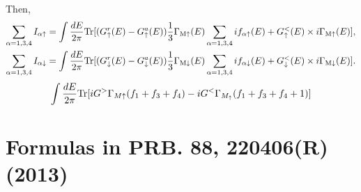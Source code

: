 \documentclass[aps,prb,superscriptaddress]{revtex4-2}
\begin{document}
Then, 
\begin{gather}
\begin{split}
\sum_{\alpha=1,3,4}I_{\alpha\uparrow} & = \int \frac{dE}{2\pi} {\rm Tr} [(G_{\uparrow}^r(E)-G_{\uparrow}^a(E))\frac{1}{3}\Gamma_{{\rm M}\uparrow}(E) \sum_{\alpha=1,3,4} if_{\alpha\uparrow}(E) + G_{\uparrow}^<(E) \times i\Gamma_{{\rm M}\uparrow}(E)], \\
\sum_{\alpha=1,3,4}I_{\alpha\downarrow} & = \int \frac{dE}{2\pi} {\rm Tr} [(G_{\downarrow}^r(E)-G_{\downarrow}^a(E))\frac{1}{3}\Gamma_{{\rm M}\downarrow}(E) \sum_{\alpha=1,3,4} if_{\alpha\downarrow}(E) + G_{\downarrow}^<(E) \times i\Gamma_{{\rm M}\downarrow}(E)].
\end{split}
\end{gather}
\begin{gather}
\begin{aligned}
\int\frac{dE}{2\pi} {\rm Tr}[ iG^{ >}\Gamma _{M\uparrow }( f_1+f_3+f_4) - iG^{ <}\Gamma _{M_{\uparrow }}( f_{1}+f_{3}+f_{4}+1)]
\end{aligned}
\end{gather}

\section{Formulas in PRB. 88, 220406(R) (2013)}
\end{document}
